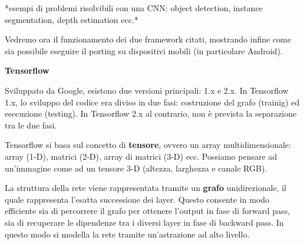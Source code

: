 \documentclass[a4paper,oneside]{book}
\begin{document}
    *esempi di problemi risolvibili con una CNN: object detection, instance segmentation, depth estimation ecc.*

    Vedremo ora il funzionamento dei due framework citati, mostrando infine
    come sia possibile eseguire il porting su dispositivi mobili (in particolare Android).

    \textbf{Tensorflow}

    Sviluppato da Google, esistono due versioni principali:
    1.x e 2.x.
    In Tensorflow 1.x, lo sviluppo del codice era diviso in 
    due fasi: costruzione del grafo (trainig) ed esecuzione (testing).
    In Tensorflow 2.x al contrario, non è prevista la separazione tra le due fasi.

    Tensorflow si basa sul concetto di \textbf{tensore}, ovvero
    un array multidimensionale: array (1-D), matrici (2-D), array di matrici (3-D) ecc.
    Possiamo pensare ad un'immagine come ad un tensore 3-D (altezza, larghezza e
    canale RGB).

    La struttura della rete viene rappresentata tramite un \textbf{grafo} unidirezionale,
    il quale rappresenta l'esatta successione dei layer. Questo consente in modo efficiente
    sia di percorrere il grafo per ottenere l'output in fase di forward pass,
    sia di recuperare le dipendenze tra i diversi layer in fase di backward pass.
    In questo modo si modella la rete tramite un'astrazione ad alto livello.

        
\end{document}
